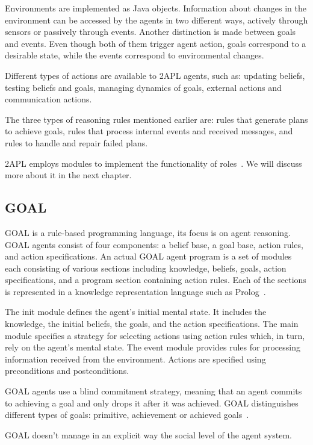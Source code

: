\documentclass[a4paper,12pt,oneside,fleqn]{book} %
\begin{document}
Environments are implemented as Java objects. Information about changes in
the environment can be accessed by the agents in two different ways,
actively through sensors or passively through events. Another distinction
is made between goals and events. Even though both of them trigger agent
action, goals correspond to a desirable state, while the events correspond
to environmental changes.

Different types of actions are available to 2APL agents, such as: updating
beliefs, testing beliefs and goals, managing dynamics of goals, external
actions and communication actions.

The three types of reasoning rules mentioned earlier are: rules that
generate plans to achieve goals, rules that process internal events and
received messages, and rules to handle and repair failed plans.

2APL employs modules to implement the functionality of
roles~\cite{dblp:conf/prima/dastanims08}. We will discuss more about it in
the next chapter.

\subsection{GOAL} %
GOAL is a rule-based programming language, its focus is on agent reasoning.
GOAL agents consist of four components: a belief base, a goal base, action
rules, and action specifications. An actual GOAL agent program is a set of
modules each consisting of various sections including knowledge, beliefs,
goals, action specifications, and a program section containing action
rules. Each of the sections is represented in a knowledge representation
language such as Prolog~\cite{DBLP:books/daglib/0076175}.

The init module defines the agent's initial mental state. It includes the
knowledge, the initial beliefs, the goals, and the action specifications.
The main module specifies a strategy for selecting actions using action
rules which, in turn, rely on the agent's mental state. The event module
provides rules for processing information received from the environment.
Actions are specified using preconditions and postconditions.

GOAL agents use a blind commitment strategy, meaning that an agent commits
to achieving a goal and only drops it after it was achieved. GOAL
distinguishes different types of goals: primitive, achievement or achieved
goals~\cite{DBLP:conf/jelia/indriksH08}.

GOAL doesn't manage in an explicit way the social level of the agent system.
\end{document}
